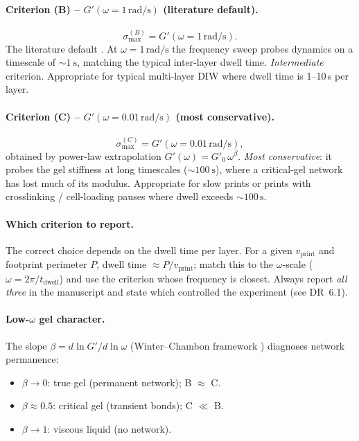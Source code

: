 \documentclass[11pt,a4paper]{article}
\begin{document}
\paragraph{Criterion (B) -- $G'(\omega=1\,\si{\radian\per\s})$ (literature default).}
\begin{equation}
\sigma_\mathrm{max}^{(B)} = G'(\omega=1\,\si{\radian\per\s}).
\label{eq:sigmaB}
\end{equation}
The literature default \citep{PaxtonEtAl2017, SchwabEtAl2020}.
At $\omega=1\,\si{\radian\per\s}$ the frequency sweep probes dynamics
on a timescale of $\sim\SI{1}{\s}$, matching the typical inter-layer
dwell time.  \emph{Intermediate} criterion.  Appropriate for typical
multi-layer DIW where dwell time is 1--10\,\si{\s} per layer.

\paragraph{Criterion (C) -- $G'(\omega=0.01\,\si{\radian\per\s})$ (most conservative).}
\begin{equation}
\sigma_\mathrm{max}^{(C)} = G'(\omega=0.01\,\si{\radian\per\s}),
\label{eq:sigmaC}
\end{equation}
obtained by power-law extrapolation $G'(\omega)=G'_0\,\omega^\beta$.
\emph{Most conservative}: it probes the gel stiffness at long timescales
($\sim\SI{100}{\s}$), where a critical-gel network has lost much of its
modulus.  Appropriate for slow prints or prints with crosslinking /
cell-loading pauses where dwell exceeds $\sim 100\,\si{\s}$.

\paragraph{Which criterion to report.}
The correct choice depends on the dwell time per layer.  For a given
$v_\mathrm{print}$ and footprint perimeter $P$, dwell time
$\approx P/v_\mathrm{print}$; match this to the $\omega$-scale
($\omega=2\pi/t_\mathrm{dwell}$) and use the criterion whose frequency
is closest.  Always report \emph{all three} in the manuscript and state
which controlled the experiment (see DR~6.1).

\paragraph{Low-$\omega$ gel character.}
The slope $\beta=d\ln G'/d\ln\omega$ (Winter--Chambon framework
\citealt{WinterChambon1987}) diagnoses network permanence:
\begin{itemize}[leftmargin=1.6em,itemsep=1pt]
\item $\beta\to 0$: true gel (permanent network); B $\approx$ C.
\item $\beta\approx 0.5$: critical gel (transient bonds); C $\ll$ B.
\item $\beta\to 1$: viscous liquid (no network).
\end{itemize}
\end{document}
